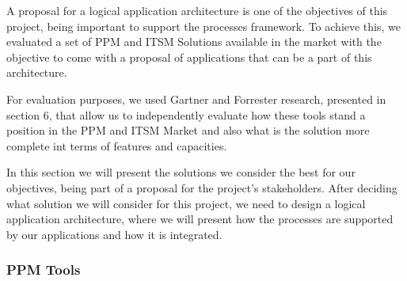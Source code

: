 A proposal for a logical application architecture is one of the objectives of this project, being important to support the processes framework. To achieve this, we evaluated a set of PPM and ITSM Solutions available in the market with the objective to come with a proposal of applications that can be a part of this architecture.\par
For evaluation purposes, we used Gartner and Forrester research, presented in section 6, that allow us to independently evaluate how these tools stand a position in the PPM and ITSM Market and also what is the solution more complete int terms of features and capacities.\par
In this section we will present the solutions we consider the best for our objectives, being part of a proposal for the project's stakeholders. After deciding what solution we will consider for this project, we need to design a logical application architecture, where we will present how the processes are supported by our applications and how it is integrated.\par

\subsubsection{PPM Tools}

